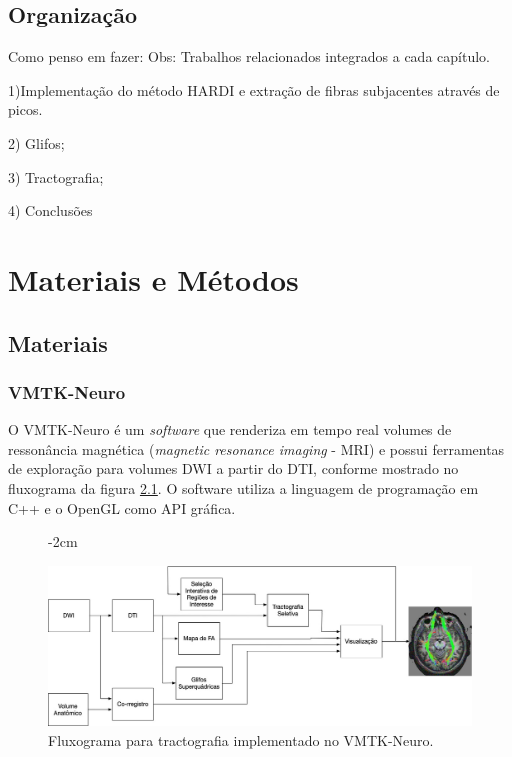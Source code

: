 \documentclass[
    12pt,                %
    oneside,            %
    a4paper,            %
    english,            %
    french,                %
    spanish,            %
    brazil                %
    ]{abntex2}
\begin{document}
\section{Organização}
\label{sec:intro_organizacao}

Como penso em fazer:
Obs: Trabalhos relacionados integrados a cada capítulo.

1)Implementação do método HARDI e extração de fibras subjacentes através de picos.

2) Glifos;

3) Tractografia;

4) Conclusões

\chapter{Materiais e Métodos}

\section{Materiais}






\subsection{VMTK-Neuro}
\label{ssec:vmtk-neuro}

O VMTK-Neuro é um \textit{software} que renderiza em tempo real volumes de ressonância magnética (\textit{magnetic resonance imaging} - MRI) e possui ferramentas de exploração para volumes DWI a partir do DTI, conforme mostrado no fluxograma da figura \ref{fig::PipelineDTI_tracto}. O software utiliza a linguagem de programação em C++ e o OpenGL como API gráfica.

\begin{figure}[ht]
   \centering
       \addtolength{\leftskip} {-2cm} %
    \addtolength{\rightskip}{-2cm}

    \centering
    \includegraphics[width=1.0\linewidth, angle=0]{figs/Fluxogramas/PipelineDTI_tracto.jpg}
    \caption{Fluxograma para tractografia implementado no VMTK-Neuro.}
    \label{fig::PipelineDTI_tracto}
\end{figure}
\end{document}
